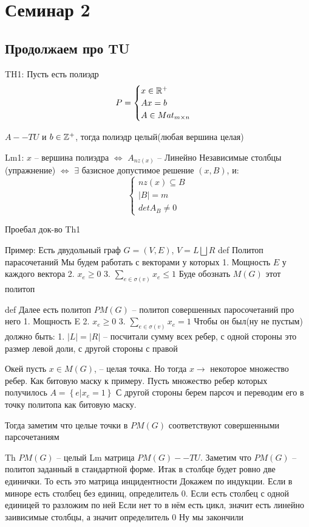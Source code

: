 \section{Семинар 2}
\subsection*{Продолжаем про TU}
TH1:
Пусть есть полиэдр
\[
	P = \begin{cases}
		x \in \mathbb{R}^+\\
		A x = b\\
		A \in Mat_{m \times n}
	\end{cases}
\]

$A -- TU$ и $b \in \mathbb{Z}^+$, тогда полиэдр целый(любая вершина целая)

Lm1: $x$ -- вершина полиэдра $\Leftrightarrow$ $A_{nz(x)}$ -- Линейно Независимые столбцы (упражнение)
$\Leftrightarrow$ $\exists$ базисное допустимое решение $(x, B)$, и:
\[
	\begin{cases}
		nz(x) \subseteq B	\\
		|B| = m\\
		det A_B \ne 0
	\end{cases}
\]


Проебал док-во Th1


Пример:
Есть двудольный граф
$G = (V, E)$, $V = L \bigsqcup R$
def Политоп парасочетаний
Мы будем работать с векторами у которых
1. Мощность $E$ у каждого вектора
2. $x_e \geq 0$
3. $\sum_{e \in \sigma(v)} x_e \leq 1$
Буде обознать $M(G)$ этот политоп


def Далее есть политоп $PM(G)$ -- политоп совершенных паросочетаний про него
1. Мощность E
2. $x_e \geq 0$
3. $\sum_{e \in \sigma(v)} x_e = 1$
Чтобы он был(ну не пустым) должно быть:
1. $|L| = |R|$ -- посчитали сумму всех ребер, с одной стороны это размер левой доли, с другой стороны с правой

Окей пусть $x \in M(G)$, -- целая точка. Но тогда $x \to$ некоторое множество ребер. Как битовую маску к примеру.
Пусть множество ребер которых получилось $A = \left\{e | x_e = 1\right\}$
С другой стороны берем парсоч и переводим его в точку политопа как битовую маску.

Тогда заметим что целые точки в $PM(G)$ соответствуют совершенными парсочетаниям

Th $PM(G)$ -- целый
Lm матрица $PM(G) -- TU$. 
Заметим что $PM(G)$ -- политоп заданный в стандартной форме.
Итак в столбце будет ровно две единички. То есть это матрица инцидентности
Докажем по индукции. Если в миноре есть столбец без единиц, определитель 0.
Если есть столбец с одной единицей то разложим по ней
Если нет то в нём есть цикл, значит есть линейно заивисимые столбцы, а значит определитель 0
Ну мы закончили

